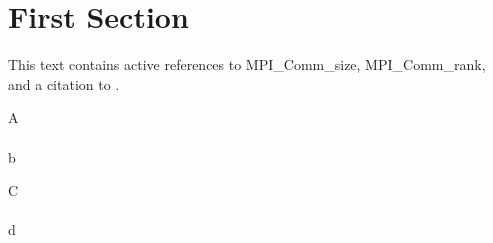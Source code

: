 \documentclass{article}
\begin{document}
\section{First Section}
This text contains active references to MPI_Comm_size, MPI_Comm_rank, and a
citation to \cite{petsc-user-ref}.

\centerline{ A \\ \\ b }

C \\ \\ d
\end{document}
